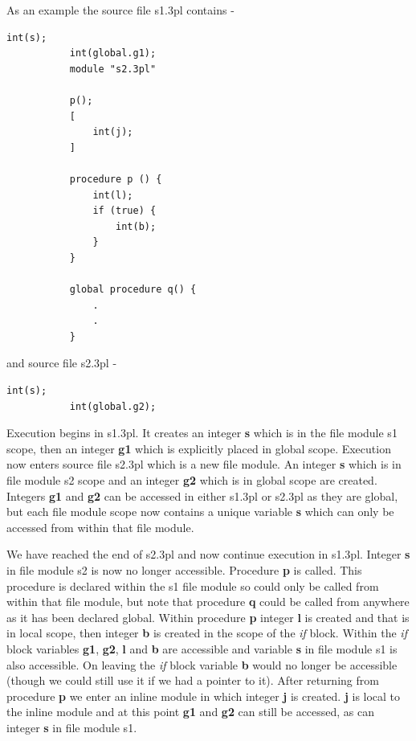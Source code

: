         As an example the source file s1.3pl contains -
        \begin{lstlisting}[gobble=8, language=threepl]
           int(s);
           int(global.g1);
           module "s2.3pl"

           p();
           [
               int(j);
           ]

           procedure p () {
               int(l);
               if (true) {
                   int(b);
               }
           }

           global procedure q() {
               .
               .
           }
        \end{lstlisting}
        and source file s2.3pl -
        \begin{lstlisting}[gobble=8, language=threepl]
           int(s);
           int(global.g2);
        \end{lstlisting}
        Execution begins in s1.3pl. It creates an integer {\bf s} which is in
        the file module s1 scope, then an integer {\bf g1} which is explicitly
        placed in global scope. Execution now enters source file s2.3pl which is
        a new file module. An integer {\bf s} which is in file module s2 scope
        and an integer {\bf g2} which is in global scope are created. Integers
        {\bf g1} and {\bf g2} can be accessed in either s1.3pl or s2.3pl as they
        are global, but each file module scope now contains a unique variable
        {\bf s} which can only be accessed from within that file module.

        We have reached the end of s2.3pl and now continue execution in s1.3pl.
        Integer {\bf s} in file module s2 is now no longer accessible. Procedure
        {\bf p} is called. This procedure is declared within the s1 file module
        so could only be called from within that file module, but note that
        procedure {\bf q} could be called from anywhere as it has been declared
        global. Within procedure {\bf p} integer {\bf l} is created and that is
        in local scope, then integer {\bf b} is created in the scope of the {\em
        if} block. Within the {\em if} block variables {\bf g1}, {\bf g2}, {\bf
        l} and {\bf b} are accessible and variable {\bf s} in file module s1 is
        also accessible. On leaving the {\em if} block variable {\bf b} would no
        longer be accessible (though we could still use it if we had a pointer
        to it). After returning from procedure {\bf p} we enter an inline module
        in which  integer {\bf j} is created. {\bf j} is local to the inline
        module and at this point {\bf g1} and {\bf g2} can still be accessed, as
        can integer {\bf s} in file module s1.

